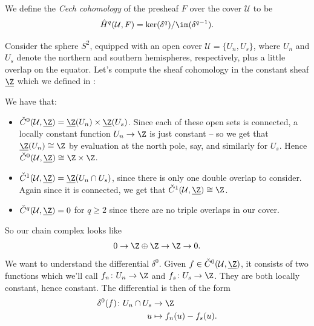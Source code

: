 \documentclass[11pt]{book}
\begin{document}
\begin{definition}\label{def:Cech-cohomology-on-cover} 
We define the \textit{Cech cohomology} of the presheaf $F$ over the cover $\mathcal{U}$ to be
\begin{align*}
    \hat{H}^q(\mathcal{U},F) = \ker(\delta^q)/\im(\delta^{q-1}).
\end{align*}
\end{definition}

\begin{example}\label{exa:s2-north-south-cover}
Consider the sphere $S^2$, equipped with an open cover $\mathcal{U} = \{U_n,U_s\}$, where $U_n$ and $U_s$ denote the northern and southern hemispheres, respectively, plus a little overlap on the equator. Let's compute the sheaf cohomology in the constant sheaf $\underline{\Z}$ which we defined in :
\begin{center} 

\end{center}
We have that:
\begin{itemize}
    \item $\check{C}^0(\mathcal{U},\underline{\Z}) = \underline{\Z}(U_n) \times \underline{\Z}(U_s)$. Since each of these open sets is connected, a locally constant function $U_n \to \Z$ is just constant -- so we get that $\underline{\Z}(U_n) \cong \Z$ by evaluation at the north pole, say, and similarly for $U_s$. Hence $\check{C}^0(\mathcal{U},\underline{\Z}) \cong \Z \times \Z$.
    \item $\check{C}^1(\mathcal{U},\underline{\Z}) = \underline{\Z}(U_n \cap U_s)$, since there is only one double overlap to consider. Again since it is connected, we get that $\check{C}^1(\mathcal{U},\underline{\Z})\cong \Z$.
    \item $\check{C}^q(\mathcal{U},\underline{\Z}) = 0$ for $q\ge2$ since there are no triple overlaps in our cover.
\end{itemize}
So our chain complex looks like
\begin{align*}
    0 \to \Z \oplus \Z \to \Z \to 0.
\end{align*}
We want to understand the differential $\delta^0$. Given $f\in \check{C}^0(\mathcal{U}, \underline{\Z})$, it consists of two functions which we'll call $f_n \colon U_n \to \Z$ and $f_s \colon U_s \to \Z$. They are both locally constant, hence constant. The differential is then of the form
\begin{align*}
    \delta^0(f) \colon U_n \cap U_s &\to \Z \\
    u &\mapsto f_n(u)-f_s(u).

\end{align*}
\end{example}
\end{document}
